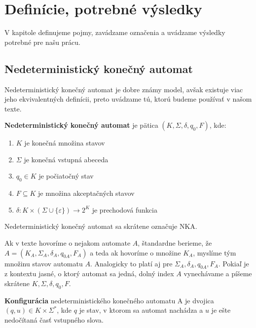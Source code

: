 \chapter{Definície, potrebné výsledky}
\label{kap:defs} %

V kapitole definujeme pojmy, zavádzame označenia a uvádzame výsledky potrebné pre našu prácu.

\section{Nedeterministický konečný automat}
Nedeterministický konečný automat je dobre známy model, avšak existuje viac jeho ekvivalentných definícii, preto uvádzame tú, ktorú budeme používať v našom texte.
\\
\begin{definition}
\textbf{Nedeterministický konečný automat} je pätica $ (K, \Sigma, \delta, q_0, F) $, kde:
\begin{enumerate}  
\item $ K $ je konečná množina stavov
\item $ \Sigma $ je konečná vstupná abeceda
\item $ q_0 \in K $ je počiatočný stav
\item $ F \subseteq K $ je množina akceptačných stavov
\item $ \delta : K \times (\Sigma \cup \lbrace \varepsilon \rbrace) \rightarrow 2^{K} $ je prechodová funkcia
\end{enumerate}

\end{definition}

\begin{note}
Nedeterministický konečný automat sa skrátene označuje NKA.
\end{note}

\begin{note}
Ak v texte hovoríme o nejakom automate $ A $, štandardne berieme, že $ A=(K_A, \Sigma_A, \delta_A, q_{0A}, F_A) $ a teda ak hovoríme o množine $ K_A $, myslíme tým množinu stavov automatu $ A $. Analogicky to platí aj pre $  \Sigma_A, \delta_A, q_{0A}, F_A $. Pokiaľ je z kontextu jasné, o ktorý automat sa jedná, dolný index $ A $ vynechávame a píšeme skrátene  $ K, \Sigma, \delta, q_0, F $.
\end{note}

\begin{definition}
\textbf{Konfigurácia} nedeterministického konečného automatu A je dvojica $ (q,u) \in K \times \Sigma^{*} $, kde $ q $ je stav, v ktorom sa automat nachádza a $ u $ je ešte nedočítaná časť vstupného slova.
\end{definition}

